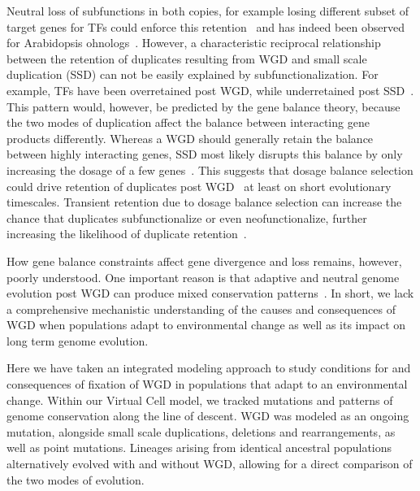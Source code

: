 Neutral loss of subfunctions in both copies, for example losing different subset of target genes for TFs could enforce this retention~\cite{force_preservation_1999} and has indeed been observed for Arabidopsis ohnologs~\cite{blanc_functional_2004,duarte_expression_2006}. However, a characteristic reciprocal relationship between the retention of duplicates resulting from WGD and small scale duplication (SSD) can not be easily explained by subfunctionalization. For example, TFs have been overretained post WGD, while underretained post SSD~\cite{papp_dosage_2003,blomme_gain_2006,hakes_all_2007,freeling_bias_2009,wang_modes_2011,rodgers-melnick_contrasting_2012}. This pattern would, however, be predicted by the gene balance theory, because the two modes of duplication affect the balance between interacting gene products differently. Whereas a WGD should generally retain the balance between highly interacting genes, SSD most likely disrupts this balance by only increasing the dosage of a few genes~\cite{hakes_all_2007,rodgers-melnick_contrasting_2012,carretero-paulet_evolutionary_2012,freeling_bias_2009}. This suggests that dosage balance selection could drive retention of duplicates post WGD~\cite{freeling_bias_2009,birchler_gene_2007} at least on short evolutionary timescales. Transient retention due to dosage balance selection can increase the chance that duplicates subfunctionalize or even neofunctionalize, further increasing the likelihood of duplicate retention~\cite{bekaert_two-phase_2011}.

How gene balance constraints affect gene divergence and loss remains, however, poorly understood. One important reason is that adaptive and neutral genome evolution post WGD can produce mixed conservation patterns~\cite{bekaert_two-phase_2011}. In short, we lack a comprehensive mechanistic understanding of the causes and consequences of WGD when populations adapt to environmental change as well as its impact on long term genome evolution.

Here we have taken an integrated modeling approach to study conditions for and consequences of fixation of WGD in populations that adapt to an environmental change. Within our Virtual Cell model, we tracked mutations and patterns of genome conservation along the line of descent. WGD was modeled as an ongoing mutation, alongside small scale duplications, deletions and rearrangements, as well as point mutations. Lineages arising from identical ancestral populations alternatively evolved with and without WGD, allowing for a direct comparison of the two modes of evolution.

